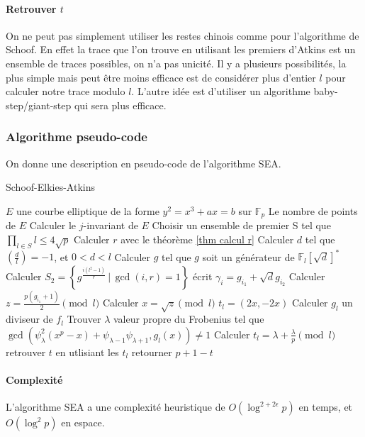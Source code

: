 \documentclass[12pt]{article}
\begin{document}
\paragraph*{Retrouver $t$}
On ne peut pas simplement utiliser les restes chinois comme pour l'algorithme de Schoof. En effet la trace que l'on trouve en utilisant les premiers d'Atkins est un ensemble de traces possibles, on n'a pas unicité. Il y a plusieurs possibilités, la plus simple mais peut être moins efficace est de considérer plus d'entier $l$ pour calculer notre trace modulo $l$. L'autre idée est d'utiliser un algorithme baby-step/giant-step qui sera plus efficace.

\newpage
\subsubsection{Algorithme pseudo-code}
On donne une description en pseudo-code de l'algorithme SEA.
\begin{algorithm}
\caption{Schoof-Elkies-Atkins}
\begin{algorithmic}
\REQUIRE $E$ une courbe elliptique de la forme $y^2 = x^3 + ax = b$ sur $\mathbb{F}_p$
\ENSURE Le nombre de points de $E$
\STATE Calculer le $j$-invariant de $E$
\STATE Choisir un ensemble de premier S tel que $\prod_{l \in S}l \leq 4\sqrt{p}$
\STATE Calculer $r$ avec le théorème \ref{thm calcul r}
\STATE Calculer $d$ tel que $(\frac{d}{l}) = -1$, et $0<d<l$
\STATE Calculer $g$ tel que $g$ soit un générateur de $\mathbb{F}_l[\sqrt{d}]^*$
\STATE Calculer $S_2 = \left\{g^{\frac{i(l^2-1)}{r}} \, | \, \gcd(i,r) = 1 \right\}$
\STATE écrit $\gamma_i = g_{i_1} + \sqrt{d}g_{i_2}$
\STATE Calculer $z= \frac{p(g_{i_1} +1)}{2} \pmod l$
\STATE Calculer $x = \sqrt{z} \pmod l$
\STATE $t_l = (2x,-2x)$
\ENDIF
\ENDFOR
\ELSE
\STATE Calculer $g_l$ un diviseur de $f_l$
\STATE Trouver $\lambda$ valeur propre du Frobenius tel que $\gcd(\psi_{\lambda}^2(x^p-x) + \psi_{\lambda-1}\psi_{\lambda+1}, g_l(x)) \ne 1$
\STATE Calculer $t_l = \lambda + \frac{\lambda}{p} \pmod l$
\ENDIF
\ENDFOR
\STATE retrouver $t$ en utlisiant les $t_l$ 
\STATE retourner $p+1-t$
\end{algorithmic}
\end{algorithm}

\paragraph*{Complexité}
L'algorithme SEA a une complexité heuristique de $O(\log^{2+2\epsilon} p)$ en temps, et $O(\log^2 p)$ en espace.
\newpage
\end{document}

